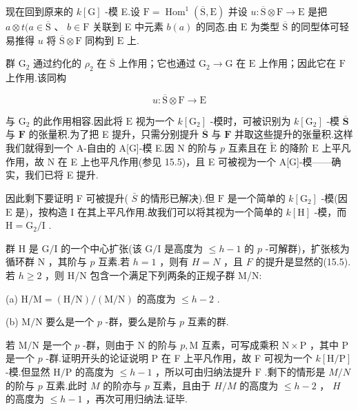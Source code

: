 \documentclass[10pt]{article}
\begin{document}
现在回到原来的 \(k\left\lbrack  \mathrm{G}\right\rbrack\) -模 E.设 \(\mathrm{F} = {\operatorname{Hom}}^{1}\left( {\overline{\mathrm{S}},\mathrm{E}}\right)\) 并设 \(u : \overline{\mathrm{S}} \otimes  \mathrm{F} \rightarrow  \mathrm{E}\) 是把 \(a \otimes  t(a \in  \overline{\mathrm{S}}\) 、 \(b \in  \mathrm{F}\) 关联到 E 中元素 \(b\left( a\right)\) 的同态.由 \(\mathrm{E}\) 为类型 \(\overline{\mathrm{S}}\) 的同型体可轻易推得 \(u\) 将 \(\overline{\mathrm{S}} \otimes  \mathrm{F}\) 同构到 \(\mathrm{E}\) 上.

群 \({\mathrm{G}}_{2}\) 通过约化的 \({\rho }_{2}\) 在 \(\overline{\mathrm{S}}\) 上作用；它也通过 \({\mathrm{G}}_{2} \rightarrow  \mathrm{G}\) 在 \(\mathrm{E}\) 上作用；因此它在 \(\mathrm{F}\) 上作用.该同构

\[
u : \overline{\mathrm{S}} \otimes  \mathrm{F} \rightarrow  \mathrm{E}
\]

与 \({\mathrm{G}}_{2}\) 的此作用相容.因此将 \(\mathrm{E}\) 视为一个 \(k\left\lbrack  {\mathrm{G}}_{2}\right\rbrack\) -模时，可被识别为 \(k\left\lbrack  {\mathrm{G}}_{2}\right\rbrack\) -模 \(\overline{\mathbf{S}}\) 与 \(\mathbf{F}\) 的张量积.为了把 E 提升，只需分别提升 \(\overline{\mathbf{S}}\) 与 \(\mathbf{F}\) 并取这些提升的张量积.这样我们就得到一个 A-自由的 A[G]-模 E.因 N 的阶与 \(p\) 互素且在 \(\widetilde{\mathrm{E}}\) 的降阶 \(\mathrm{E}\) 上平凡作用，故 \(\mathrm{N}\) 在 E 上也平凡作用(参见 15.5)，且 E 可被视为一个 A[G]-模——确实，我们已将 E 提升.

因此剩下要证明 F 可被提升( \(\bar{S}\) 的情形已解决).但 \(\mathrm{F}\) 是一个简单的 \(k\left\lbrack  {\mathrm{G}}_{2}\right\rbrack\) -模(因 \(\mathrm{E}\) 是)，按构造 I 在其上平凡作用.故我们可以将其视为一个简单的 \(k\left\lbrack  \mathrm{H}\right\rbrack\) -模，而 \(\mathrm{H} = {\mathrm{G}}_{2}/\mathrm{I}\) .

群 \(\mathrm{H}\) 是 \(\mathrm{G}/\mathrm{I}\) 的一个中心扩张(该 \(\mathrm{G}/\mathrm{I}\) 是高度为 \(\leq  h - 1\) 的 \(p\) -可解群)，扩张核为循环群 \(\mathrm{N}\) ，其阶与 \(p\) 互素.若 \(h = 1\) ，则有 \(H = N\) ，且 \(F\) 的提升是显然的(15.5).若 \(h \geq  2\) ，则 H/N 包含一个满足下列两条的正规子群 M/N:

(a) \(\mathrm{H}/\mathrm{M} = \left( {\mathrm{H}/\mathrm{N}}\right) /\left( {\mathrm{M}/\mathrm{N}}\right)\) 的高度为 \(\leq  h - 2\) .

(b) \(\mathrm{M}/\mathrm{N}\) 要么是一个 \(p\) -群，要么是阶与 \(p\) 互素的群.

若 \(\mathrm{M}/\mathrm{N}\) 是一个 \(p\) -群，则由于 \(\mathrm{N}\) 的阶与 \(p,\mathrm{M}\) 互素，可写成乘积 \(\mathrm{N} \times  \mathrm{P}\) ，其中 \(\mathrm{P}\) 是一个 \(p\) -群.证明开头的论证说明 P 在 F 上平凡作用，故 F 可视为一个 \(k\left\lbrack  {\mathrm{H}/\mathrm{P}}\right\rbrack\) -模.但显然 \(\mathrm{H}/\mathrm{P}\) 的高度为 \(\leq  h - 1\) ，所以可由归纳法提升 \(\mathrm{F}\) .剩下的情形是 \(M/N\) 的阶与 \(p\) 互素.此时 \(M\) 的阶亦与 \(p\) 互素，且由于 \(H/M\) 的高度为 \(\leq  h - 2\) ， \(H\) 的高度为 \(\leq  h - 1\) ，再次可用归纳法.证毕.
\end{document}
